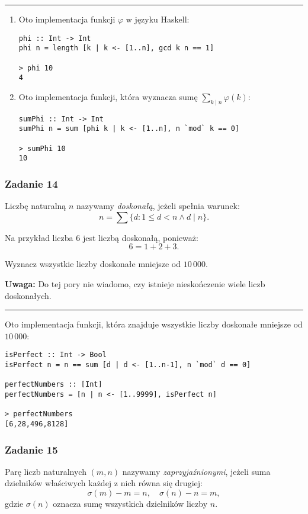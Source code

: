\documentclass[11pt,a4paper]{article}
\begin{document}
\bigskip
\hrule
\bigskip

\begin{enumerate}
    \item Oto implementacja funkcji \(\varphi\) w języku Haskell:
        \begin{Verbatim}[frame=single]
phi :: Int -> Int
phi n = length [k | k <- [1..n], gcd k n == 1]

> phi 10
4
        \end{Verbatim}
    \item Oto implementacja funkcji, która wyznacza sumę \(\sum_{k \mid n} \varphi(k)\):
        \begin{Verbatim}[frame=single]
sumPhi :: Int -> Int
sumPhi n = sum [phi k | k <- [1..n], n `mod` k == 0]

> sumPhi 10
10
        \end{Verbatim}
\end{enumerate}

\subsubsection{Zadanie 14}
Liczbę naturalną \(n\) nazywamy \textit{doskonałą}, jeżeli spełnia warunek:
\begin{equation}
    n = \sum \{ d : 1 \leq d < n \land d \mid n \}.
\end{equation}

Na przykład liczba \(6\) jest liczbą doskonałą, ponieważ:
\begin{equation}
    6 = 1 + 2 + 3.
\end{equation}

Wyznacz wszystkie liczby doskonałe mniejsze od \(10\,000\).

\textbf{Uwaga:} Do tej pory nie wiadomo, czy istnieje nieskończenie wiele liczb doskonałych.

\bigskip
\hrule
\bigskip

Oto implementacja funkcji, która znajduje wszystkie liczby doskonałe mniejsze od \(10\,000\):
\begin{Verbatim}[frame=single]
isPerfect :: Int -> Bool
isPerfect n = n == sum [d | d <- [1..n-1], n `mod` d == 0]

perfectNumbers :: [Int]
perfectNumbers = [n | n <- [1..9999], isPerfect n]

> perfectNumbers
[6,28,496,8128]
\end{Verbatim}

\subsubsection{Zadanie 15}
Parę liczb naturalnych \((m, n)\) nazywamy \textit{zaprzyjaźnionymi}, jeżeli suma dzielników właściwych każdej z nich równa się drugiej:
\[
    \sigma(m) - m = n, \quad \sigma(n) - n = m,
\]
gdzie \(\sigma(n)\) oznacza sumę wszystkich dzielników liczby \(n\).
\end{document}
